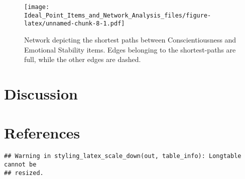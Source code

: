 \documentclass[english,man]{apa6}
\theoremstyle{definition}
\theoremstyle{definition}
\theoremstyle{remark}
\begin{document}
\begin{figure}[htbp]
\centering
\texttt{[image: Ideal\_Point\_Items\_and\_Network\_Analysis\_files/figure-latex/unnamed-chunk-8-1.pdf]}
\caption{\label{fig:unnamed-chunk-8}Network depicting the shortest paths
between Conscientiousness and Emotional Stability items. Edges belonging
to the shortest-paths are full, while the other edges are dashed.}
\end{figure}

\section{\texorpdfstring{\textbf{Discussion}}{Discussion}}\label{discussion}

\newpage

\section{References}\label{references}

\begin{verbatim}
## Warning in styling_latex_scale_down(out, table_info): Longtable cannot be
## resized.
\end{verbatim}
\end{document}
